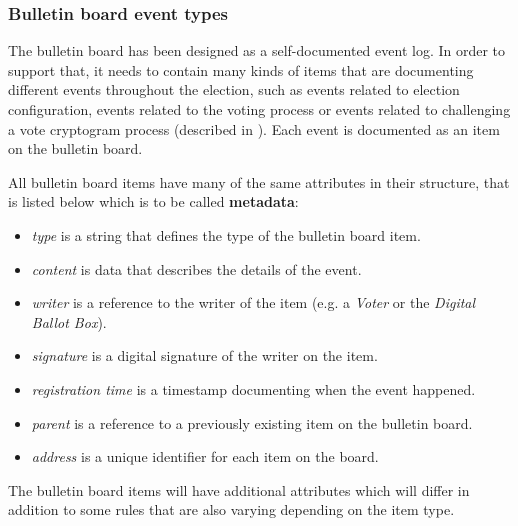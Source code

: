 


\subsubsection{Bulletin board event types} \label{sec: bulletin board event types}
The bulletin board has been designed as a self-documented event log. In order to support that, it needs to contain many kinds of items that are documenting different events throughout the election, such as events related to election configuration, events related to the voting process or events related to challenging a vote cryptogram process (described in ). Each event is documented as an item on the bulletin board.

All bulletin board items have many of the same attributes in their structure, that is listed below which is to be called \textbf{metadata}:
\begin{itemize}
    \item \textit{type} is a string that defines the type of the bulletin board item.
    \item \textit{content} is data that describes the details of the event.
    \item \textit{writer} is a reference to the writer of the item (e.g. a \textit{Voter} or the \textit{Digital Ballot Box}).
    \item \textit{signature} is a digital signature of the writer on the item.
    \item \textit{registration time} is a timestamp documenting when the event happened.
    \item \textit{parent} is a reference to a previously existing item on the bulletin board.
    \item \textit{address} is a unique identifier for each item on the board.
\end{itemize}

The bulletin board items will have additional attributes which will differ in addition to some rules that are also varying depending on the item type.

